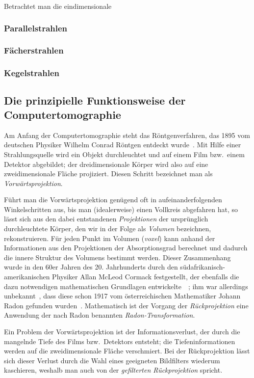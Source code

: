 Betrachtet man die eindimensionale 

\subsubsection{Parallelstrahlen}

\subsubsection{Fächerstrahlen}

\subsubsection{Kegelstrahlen}

\subsection{Die prinzipielle Funktionsweise der Computertomographie}

Am Anfang der Computertomographie steht das Röntgenverfahren, das 1895 vom deutschen Physiker Wilhelm Conrad Röntgen
entdeckt wurde~\cite{roentgen}. Mit Hilfe einer Strahlungsquelle wird ein Objekt durchleuchtet und auf einem Film bzw.\
einem Detektor abgebildet; der dreidimensionale Körper wird also auf eine zweidimensionale Fläche projiziert. Diesen
Schritt bezeichnet man als \textit{Vorwärtsprojektion}.

Führt man die Vorwärtsprojektion genügend oft in aufeinanderfolgenden Winkelschritten aus, bis man (idealerweise) einen
Vollkreis abgefahren hat, so lässt sich aus den dabei entstandenen \textit{Projektionen} der ursprünglich durchleuchtete
Körper, den wir in der Folge als \textit{Volumen} bezeichnen, rekonstruieren. Für jeden Punkt im Volumen
(\textit{\gls{voxel}}) kann anhand der Informationen aus den Projektionen der Absorptionsgrad berechnet und dadurch die
innere Struktur des Volumens bestimmt werden. Dieser Zusammenhang wurde in den 60er Jahren des 20. Jahrhunderts durch
den südafrikanisch-amerikanischen Physiker Allan McLeod Cormack festgestellt, der ebenfalls die dazu notwendigen
mathematischen Grundlagen entwickelte~\cite{cormack63}~\cite{cormack64}; ihm war allerdings unbekannt~\cite{cormack79},
dass diese schon 1917 vom österreichischen Mathematiker Johann Radon gefunden wurden~\cite{radon}. Mathematisch ist der
Vorgang der \textit{Rückprojektion} eine Anwendung der nach Radon benannten \textit{Radon-Transformation}.

Ein Problem der Vorwärtsprojektion ist der Informationsverlust, der durch die mangelnde Tiefe des Films bzw.\ Detektors
entsteht; die Tiefeninformationen werden auf die zweidimensionale Fläche {\glqq}verschmiert{\grqq}. Bei der
Rückprojektion lässt sich dieser Verlust durch die Wahl eines geeigneten Bildfilters wiederum kaschieren, weshalb man
auch von der \textit{gefilterten Rückprojektion} spricht.

